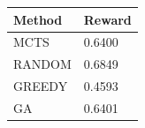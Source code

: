 \begin{tabular}{ll}
\hline
Method & Reward \\
\hline
  MCTS & 0.6400 \\
  RANDOM & 0.6849 \\
  GREEDY & 0.4593 \\
  GA & 0.6401 \\
\hline
\end{tabular}
